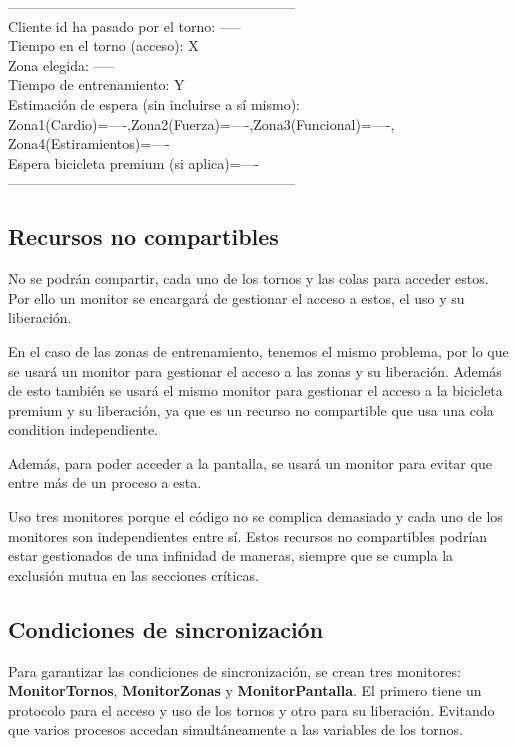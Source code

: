 \documentclass[a4paper,12pt,titlepage,oneside]{article}
\begin{document}
    \newpage
    \textcolor{black!70}{
    -------------------------------------------------------------- \\
    Cliente id ha pasado por el torno: ----- \\
    Tiempo en el torno (acceso): X \\
    Zona elegida: ----- \\
    Tiempo de entrenamiento: Y \\
    Estimación de espera (sin incluirse a sí mismo): \\
    \hspace*{1em}Zona1(Cardio)=----,\hspace*{2em}Zona2(Fuerza)=----,\hspace*{2em}Zona3(Funcional)=----,\\
    Zona4(Estiramientos)=---- \\
    Espera bicicleta premium (si aplica)=---- \\
    -------------------------------------------------------------- \\
    }
    \fi
    \subsection{Recursos no compartibles}
    No se podrán compartir, cada uno de los tornos y las colas para acceder estos. Por 
    ello un monitor se encargará de gestionar el acceso a estos, el uso y su liberación.
    
    En el caso de las zonas de entrenamiento, tenemos el mismo problema, por lo que 
    se usará un monitor para gestionar el acceso a las zonas y su liberación. Además 
    de esto también se usará el mismo monitor para gestionar el acceso a la bicicleta 
    premium y su liberación, ya que es un recurso no compartible que usa una cola 
    condition independiente.

    Además, para poder acceder a la pantalla, se usará un monitor para evitar que entre
    más de un proceso a esta.

    Uso tres monitores porque el código no se complica demasiado y cada uno de los
    monitores son independientes entre sí. Estos recursos no compartibles podrían 
    estar gestionados de una infinidad de maneras, siempre que se cumpla la exclusión
    mutua en las secciones críticas.
    \subsection{Condiciones de sincronización}
    Para garantizar las condiciones de sincronización, se crean tres monitores: \textbf{MonitorTornos},
    \textbf{MonitorZonas} y \textbf{MonitorPantalla}. El primero tiene un protocolo para el acceso y uso
    de los tornos y otro para su liberación. Evitando que varios procesos accedan simultáneamente a las
    variables de los tornos.
\end{document}
